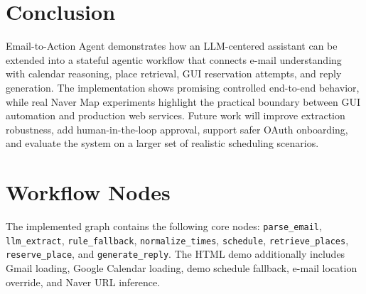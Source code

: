 \documentclass[sigconf,nonacm]{acmart}
\begin{document}
\section{Conclusion}
Email-to-Action Agent demonstrates how an LLM-centered assistant can be extended into a stateful agentic workflow that connects e-mail understanding with calendar reasoning, place retrieval, GUI reservation attempts, and reply generation. The implementation shows promising controlled end-to-end behavior, while real Naver Map experiments highlight the practical boundary between GUI automation and production web services. Future work will improve extraction robustness, add human-in-the-loop approval, support safer OAuth onboarding, and evaluate the system on a larger set of realistic scheduling scenarios.




\appendix
\section{Workflow Nodes}
The implemented graph contains the following core nodes: \texttt{parse\_email}, \texttt{llm\_extract}, \texttt{rule\_fallback}, \texttt{normalize\_times}, \texttt{schedule}, \texttt{retrieve\_places}, \texttt{reserve\_place}, and \texttt{generate\_reply}. The HTML demo additionally includes Gmail loading, Google Calendar loading, demo schedule fallback, e-mail location override, and Naver URL inference.
\end{document}
